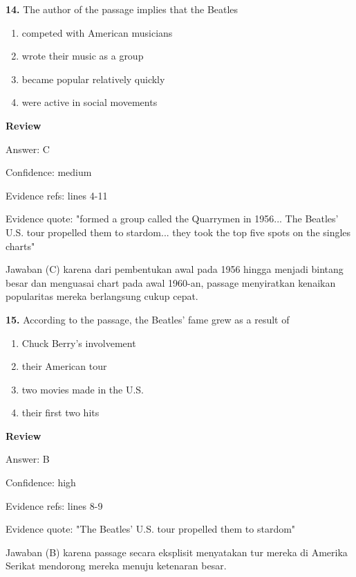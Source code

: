 \documentclass[12pt]{article}
\begin{document}
\noindent\textbf{14.} The author of the passage implies that the Beatles
\begin{enumerate}[label=(\Alph*),leftmargin=*,itemsep=0.2em]
\item competed with American musicians
\item wrote their music as a group
\item became popular relatively quickly
\item were active in social movements
\end{enumerate}
\par
\begingroup
\setlength{\parskip}{0pt}
\setlength{\parindent}{0pt}
\textbf{Review}\par
Answer: C\par
Confidence: medium\par
Evidence refs: lines 4-11\par
Evidence quote: "formed a group called the Quarrymen in 1956... The Beatles' U.S. tour propelled them to stardom... they took the top five spots on the singles charts"\par
Jawaban (C) karena dari pembentukan awal pada 1956 hingga menjadi bintang besar dan menguasai chart pada awal 1960-an, passage menyiratkan kenaikan popularitas mereka berlangsung cukup cepat.\par
\endgroup
\par
\vspace{0.25\baselineskip}
\noindent\textbf{15.} According to the passage, the Beatles' fame grew as a result of
\begin{enumerate}[label=(\Alph*),leftmargin=*,itemsep=0.2em]
\item Chuck Berry's involvement
\item their American tour
\item two movies made in the U.S.
\item their first two hits
\end{enumerate}
\par
\begingroup
\setlength{\parskip}{0pt}
\setlength{\parindent}{0pt}
\textbf{Review}\par
Answer: B\par
Confidence: high\par
Evidence refs: lines 8-9\par
Evidence quote: "The Beatles' U.S. tour propelled them to stardom"\par
Jawaban (B) karena passage secara eksplisit menyatakan tur mereka di Amerika Serikat mendorong mereka menuju ketenaran besar.\par
\end{document}
